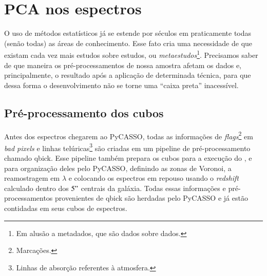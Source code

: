 



\chapter{PCA nos espectros}
\label{sec:UsoPCA}

O uso de métodos estatísticos já se estende por séculos em praticamente todas (senão todas) as áreas de conhecimento.
Esse fato cria uma necessidade de que existam cada vez mais estudos sobre estudos, ou {\em metaestudos}\footnote{Em
alusão a metadados, que são dados sobre dados.}. Precisamos saber de que maneira os pré-processamentos de nossa amostra
afetam os dados e, principalmente, o resultado após a aplicação de determinada técnica, para que dessa forma o
desenvolvimento não se torne uma ``caixa preta'' inacessível.

\section{Pré-processamento dos cubos}
\label{sec:UsoPCA:PCAlidades}

Antes dos espectros chegarem ao PyCASSO, todas as informações de {\em flags}\footnote{Marcações.} em {\em bad pixels} e
linhas telúricas\footnote{Linhas de absorção referentes à atmosfera.} são criadas em um pipeline de pré-processamento
chamado {\sc qbick}. Esse pipeline também prepara os cubos para a execução do \starlight, e para organização deles pelo
PyCASSO, definindo as zonas de Voronoi, a reamostragem em $\lambda$ e colocando os espectros em repouso usando o {\em
redshift} calculado dentro dos $5"$ centrais da galáxia. Todas essas informações e pré-processamentos provenientes de
{\sc qbick} são herdadas pelo PyCASSO e já estão contidadas em seus cubos de espectros.


